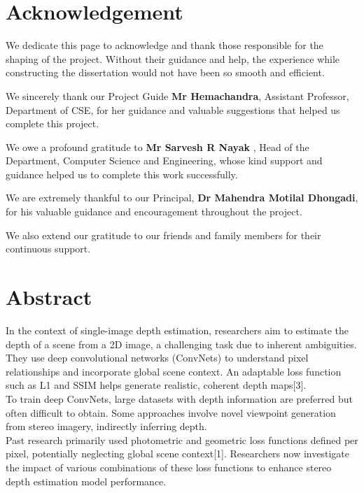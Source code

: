 \documentclass[12pt,a4paper]{report}
\begin{document}
\chapter*{Acknowledgement}
We dedicate this page to acknowledge and thank those responsible for the shaping of the project. Without their guidance and help, the experience while constructing the dissertation would not have been so smooth and efficient.
\par
\vspace{0.22in}
\noindent We sincerely thank our Project Guide \textbf{Mr Hemachandra}, Assistant Professor, Department of CSE, for her guidance and valuable suggestions that helped us complete this project.
\par
\vspace{0.22in}
\noindent We owe a profound gratitude to \textbf{ Mr Sarvesh R Nayak }, Head of the Department, Computer Science and Engineering, whose kind support and guidance helped us to complete this work successfully.
\par
\vspace{0.22in}
\noindent We are extremely thankful to our Principal, \textbf{Dr Mahendra Motilal Dhongadi}, for his valuable guidance and encouragement throughout the project.
\par
\vspace{0.22in}
\par
\vspace{0.22in}
\noindent We also extend our gratitude to our friends and family members for their continuous support.




\pagestyle{plain}
\chapter*{Abstract}
In the context of single-image depth estimation, researchers aim to estimate the depth of
a scene from a 2D image, a challenging task due to inherent ambiguities. They use deep
convolutional networks (ConvNets) to understand pixel relationships and incorporate global
scene context. An adaptable loss function such as L1 and SSIM helps generate realistic,
coherent depth maps[3].\\
To train deep ConvNets, large datasets with depth information are preferred but often
difficult to obtain. Some approaches involve novel viewpoint generation from stereo imagery,
indirectly inferring depth.\\
Past research primarily used photometric and geometric loss functions defined per pixel,
potentially neglecting global scene context[1]. Researchers now investigate the impact of
various combinations of these loss functions to enhance stereo depth estimation model
performance. \\
\end{document}
